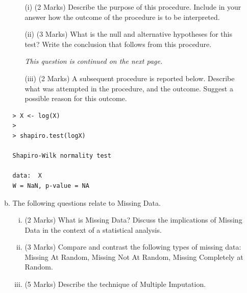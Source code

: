 \documentclass[a4paper,12pt]{article}
\begin{document}
\begin{enumerate}
\begin{enumerate}[(a)]
\begin{itemize}
	\item[(i)] (2 Marks) Describe the purpose of this procedure. Include in your answer how the outcome of the procedure is to be interpreted.
	\item[(ii)] (3 Marks) What is the null and alternative hypotheses for this test? Write the conclusion that follows from this procedure.
\medskip


\noindent \textit{This question is continued on the next page.}
	
\newpage	
\item[(iii)] (2 Marks) A subsequent procedure is reported below. Describe what was attempted in the procedure, and the outcome. Suggest a possible reason for this outcome.
\end{itemize}

\begin{framed}
\begin{verbatim}
> X <- log(X)
>
> shapiro.test(logX)
	
Shapiro-Wilk normality test
	
data:  X
W = NaN, p-value = NA
\end{verbatim}
\end{framed}



%
%
%

\bigskip
	\item The following questions relate to Missing Data.
\begin{enumerate}[(i)]
	\item (2 Marks) What is Missing Data? Discuss the implications of Missing Data in the context of a statistical analysis.
	\item (3 Marks) Compare and contrast the following types of missing data: Missing At Random, Missing Not At Random, Missing Completely at Random.
	\item (5 Marks) Describe the technique of Multiple Imputation.


\end{enumerate}
\end{enumerate}
\end{enumerate}
\end{document}
